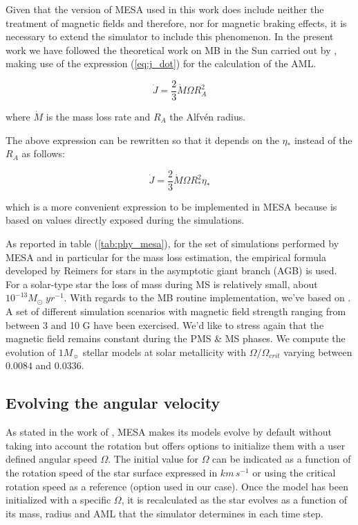 \documentclass[fleqn,usenatbib]{mnras}
\begin{document}
Given that the version of MESA used in this work does include neither the treatment of magnetic fields and therefore, nor for magnetic braking effects, it is necessary to extend the simulator to include this phenomenon. In the present work we have followed the theoretical work on MB in the Sun carried out by \citet{Weber1967}, making use of the expression (\ref{eq:j_dot}) for the calculation of the AML.
\begin{ceqn}
\begin{equation}
 \Dot{J} = \frac{2}{3} \Dot{M}\Omega R^{2}_{A} \label{eq:j_dot}
\end{equation}
\end{ceqn}
where $\Dot{M}$ is the mass loss rate and $R_A$ the Alfv\'{e}n radius. \par

The above expression can be rewritten so that it depends on the $\eta_*$ instead of the $R_A$ as follows:
\begin{ceqn}
\begin{equation}
 \Dot{J} = \frac{2}{3} \Dot{M}\Omega R^{2}_{*}\eta_* \label{eq:j_dot_mesa}
\end{equation}
\end{ceqn}
which is a more convenient expression to be implemented in MESA because is based on values directly exposed during the simulations.

As reported in table (\ref{tab:phy_mesa}), for the set of simulations performed by MESA and in particular for the mass loss estimation, the empirical formula developed by Reimers for stars in the asymptotic giant branch (AGB) is used.  For a solar-type star the loss of mass during MS is relatively small, about  $10^{-13}M_{\odot} \; yr^{-1}$. With regards to the MB routine implementation, we've based on \citet{Ud-Doula2007}. A set of different simulation scenarios with magnetic field strength ranging from between 3 and 10 G have been exercised. We'd like to stress again that the magnetic field remains constant during the PMS \& MS phases. We compute the evolution of $1M_{\sun}$ stellar models at solar metallicity with $\Omega / \Omega_{crit}$ varying between $0.0084$ and $0.0336$.\par

\subsection{Evolving the angular velocity}
As stated in the work of \citet{Paxton2015}, MESA makes its models evolve by default without taking into account the rotation but offers options to initialize them with a user defined angular speed $\Omega$. The initial value for $\Omega$ can be indicated as a function of the rotation speed of the star surface expressed in $km\,s^{-1}$ or using the critical rotation speed as a reference (option used in our case).  Once the model has been initialized with a specific $\Omega$, it is recalculated as the star evolves as a function of its mass, radius and AML that the simulator determines in each time step. \par
\end{document}
